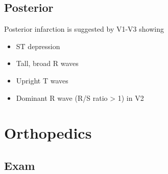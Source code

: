 \documentclass[8pt]{extarticle}
\begin{document}
\subsection{Posterior}
Posterior infarction is suggested by V1-V3 showing
\begin{itemize}
    \item ST depression
    \item Tall, broad R waves
    \item Upright T waves
    \item Dominant R wave (R/S ratio > 1) in V2
\end{itemize}

\section{Orthopedics}
\subsection{Exam}
\end{document}
